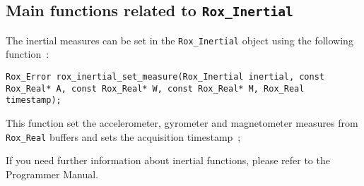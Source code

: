 \subsection{Main functions related to {\tt Rox\_Inertial}}
\label{sse:inertial_functs}

The inertial measures can be set in the \lstinline$Rox_Inertial$ object using the following function~:

\begin{lstlisting}
Rox_Error rox_inertial_set_measure(Rox_Inertial inertial, const Rox_Real* A, const Rox_Real* W, const Rox_Real* M, Rox_Real timestamp);
\end{lstlisting}

This function set the accelerometer, gyrometer and magnetometer measures from \lstinline$Rox_Real$ buffers and sets the acquisition timestamp~;

If you need further information about inertial functions, please refer to the Programmer Manual.

